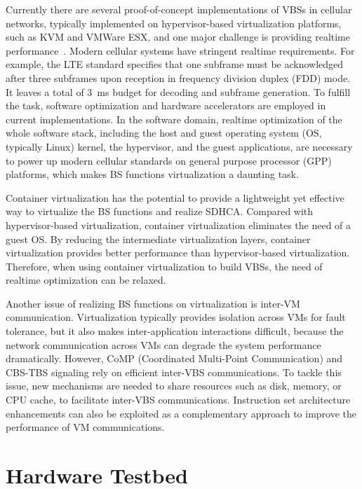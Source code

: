 \documentclass[12pt, draftclsnofoot,onecolumn]{IEEEtran}
\begin{document}
Currently there are several proof-of-concept implementations of
VBSs in cellular networks, typically implemented on hypervisor-based virtualization platforms,
such as KVM and VMWare ESX, and one major challenge is providing realtime performance~\cite{cmri2013cran}.
Modern cellular systems have stringent realtime
requirements. For example, the LTE standard specifies that one subframe must be acknowledged
after three subframes upon reception in frequency division duplex (FDD) mode.
It leaves a total of \SI{3}{ms} budget for decoding and subframe generation.
To fulfill the task, software optimization and hardware accelerators are
employed in current implementations. In the software domain, realtime optimization of the whole software stack,
including the host and guest operating system (OS, typically Linux) kernel, the hypervisor,
and the guest applications, are necessary to power up modern cellular
standards on general purpose processor (GPP) platforms, which makes BS
functions virtualization a daunting task.

Container virtualization has the potential to provide a lightweight yet effective way to
virtualize the BS functions and realize SDHCA.
Compared with hypervisor-based virtualization, container virtualization
eliminates the need of a guest OS. By reducing the intermediate virtualization
layers, container virtualization provides better performance than hypervisor-based
virtualization.
Therefore, when using container virtualization to build VBSs, the need of realtime optimization can be relaxed.

Another issue of realizing BS functions on virtualization is
inter-VM communication.  Virtualization typically provides isolation across VMs
for fault tolerance, but it also makes inter-application interactions difficult, because the network
communication across VMs can degrade the system performance
dramatically.  However, CoMP (Coordinated Multi-Point Communication) and
CBS-TBS signaling rely on efficient inter-VBS communications.  To
tackle this issue, new mechanisms are needed to share resources such as disk, memory, or CPU cache, to facilitate inter-VBS communications.
Instruction set architecture enhancements can also be exploited as a
complementary approach to improve the performance of VM communications.

\section{Hardware Testbed}
\label{sec:testbed}
\end{document}
